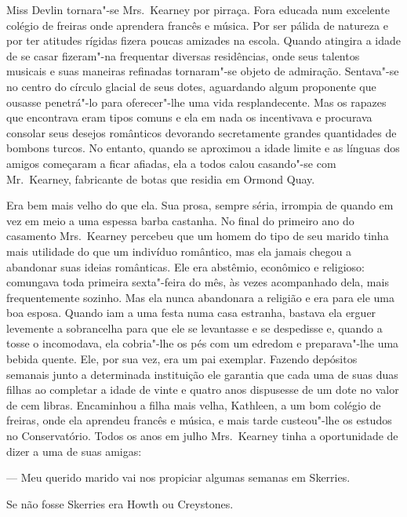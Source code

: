Miss Devlin tornara"-se Mrs.~Kearney por pirraça.  Fora educada num excelente
colégio de freiras onde aprendera francês e música.  Por ser pálida de natureza
e por ter atitudes rígidas fizera poucas amizades na escola.  Quando atingira a
idade de se casar fizeram"-na frequentar diversas residências, onde seus
talentos musicais e suas maneiras refinadas tornaram"-se objeto de admiração.
Sentava"-se no centro do círculo glacial de seus dotes, aguardando algum
proponente que ousasse penetrá"-lo para oferecer"-lhe uma vida resplandecente.
Mas os rapazes que encontrava eram tipos comuns e ela em nada os incentivava e
procurava consolar seus desejos românticos devorando secretamente grandes
quantidades de bombons turcos.  No entanto, quando se aproximou a idade limite
e as línguas dos amigos começaram a ficar afiadas, ela a todos calou casando"-se
com Mr.~Kearney, fabricante de botas que residia em Ormond Quay.

Era bem mais velho do que ela.  Sua prosa, sempre séria, irrompia de quando em
vez em meio a uma espessa barba castanha.  No final do primeiro ano do
casamento Mrs.~Kearney percebeu que um homem do tipo de seu marido tinha mais
utilidade do que um indivíduo romântico, mas ela jamais chegou a abandonar suas
ideias românticas.  Ele era abstêmio, econômico e religioso: comungava toda
primeira sexta"-feira do mês, às vezes acompanhado dela, mais frequentemente
sozinho.  Mas ela nunca abandonara a religião e era para ele uma boa esposa.
Quando iam a uma festa numa casa estranha, bastava ela erguer levemente a
sobrancelha para que ele se levantasse e se despedisse e, quando a tosse o
incomodava, ela cobria"-lhe os pés com um edredom e preparava"-lhe uma bebida
quente.  Ele, por sua vez, era um pai exemplar.  Fazendo depósitos semanais
junto a determinada instituição ele garantia que cada uma de suas duas filhas
ao completar a idade de vinte e quatro anos dispusesse de um dote no valor de
cem libras.  Encaminhou a filha mais velha, Kathleen, a um bom colégio de
freiras, onde ela aprendeu francês e música, e mais tarde custeou"-lhe os
estudos no Conservatório.  Todos os anos em julho Mrs.~Kearney tinha a
oportunidade de dizer a uma de suas amigas:

--- Meu querido marido vai nos propiciar algumas semanas em Skerries.

Se não fosse Skerries era Howth ou Creystones.

